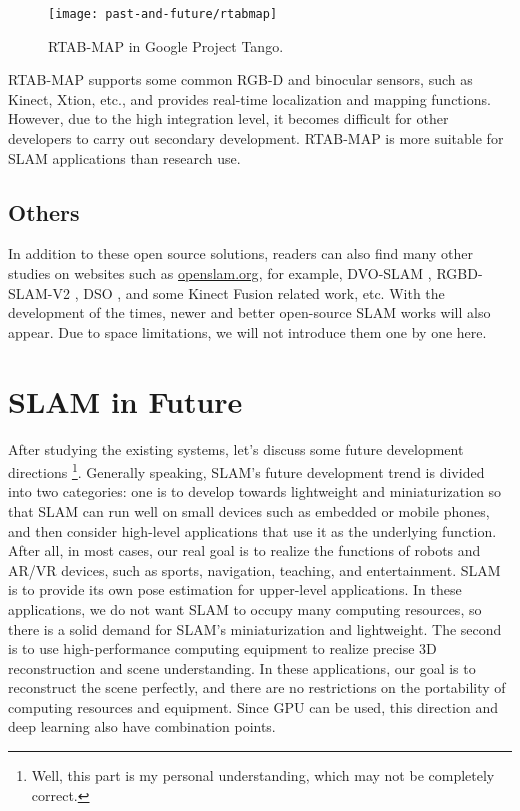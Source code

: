 \begin{figure}[!ht]
	\centering
	\texttt{[image: past-and-future/rtabmap]}
	\caption{RTAB-MAP in Google Project Tango.}
	\label{fig:rtabmap}
\end{figure}

RTAB-MAP supports some common RGB-D and binocular sensors, such as Kinect, Xtion, etc., and provides real-time localization and mapping functions. However, due to the high integration level, it becomes difficult for other developers to carry out secondary development. RTAB-MAP is more suitable for SLAM applications than research use.

\subsection{Others}
In addition to these open source solutions, readers can also find many other studies on websites such as \url{openslam.org}, for example, DVO-SLAM {\cite{Kerl2013a}}, RGBD-SLAM-V2 {\cite{Endres2014}}, DSO  {\cite{Engel2016}}, and some Kinect Fusion related work, etc. With the development of the times, newer and better open-source SLAM works will also appear. Due to space limitations, we will not introduce them one by one here.

\section{SLAM in Future}
After studying the existing systems, let's discuss some future development directions \footnote{Well, this part is my personal understanding, which may not be completely correct.}. Generally speaking, SLAM's future development trend is divided into two categories: one is to develop towards lightweight and miniaturization so that SLAM can run well on small devices such as embedded or mobile phones, and then consider high-level applications that use it as the underlying function. After all, in most cases, our real goal is to realize the functions of robots and AR/VR devices, such as sports, navigation, teaching, and entertainment. SLAM is to provide its own pose estimation for upper-level applications. In these applications, we do not want SLAM to occupy many computing resources, so there is a solid demand for SLAM's miniaturization and lightweight. The second is to use high-performance computing equipment to realize precise 3D reconstruction and scene understanding. In these applications, our goal is to reconstruct the scene perfectly, and there are no restrictions on the portability of computing resources and equipment. Since GPU can be used, this direction and deep learning also have combination points.

